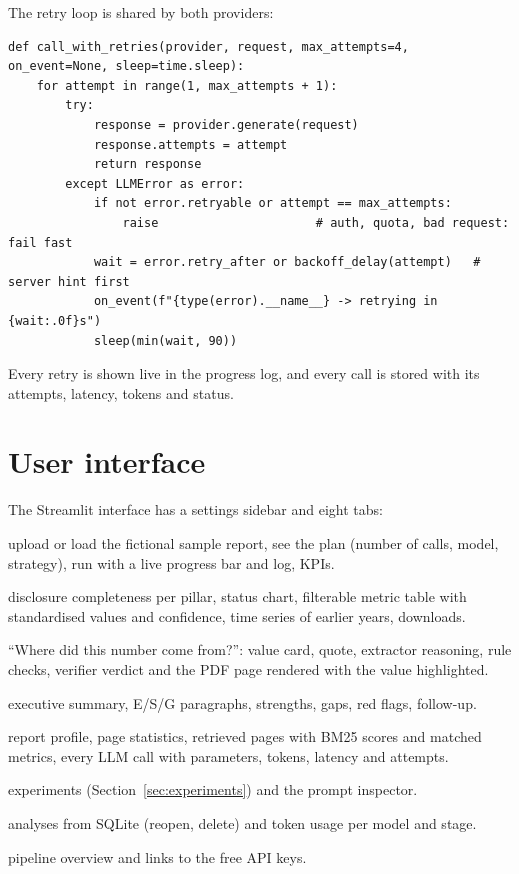 \documentclass[11pt,a4paper]{article}
\begin{document}
The retry loop is shared by both providers:
\begin{lstlisting}[style=py]
def call_with_retries(provider, request, max_attempts=4, on_event=None, sleep=time.sleep):
    for attempt in range(1, max_attempts + 1):
        try:
            response = provider.generate(request)
            response.attempts = attempt
            return response
        except LLMError as error:
            if not error.retryable or attempt == max_attempts:
                raise                      # auth, quota, bad request: fail fast
            wait = error.retry_after or backoff_delay(attempt)   # server hint first
            on_event(f"{type(error).__name__} -> retrying in {wait:.0f}s")
            sleep(min(wait, 90))
\end{lstlisting}
Every retry is shown live in the progress log, and every call is stored with its attempts, latency, tokens
and status.

\section{User interface}\label{sec:ui}
The Streamlit interface has a settings sidebar and eight tabs:
\begin{description}[style=nextline,leftmargin=1.2cm]
  \item[Analyze] upload or load the fictional sample report, see the plan (number of calls, model,
        strategy), run with a live progress bar and log, KPIs.
  \item[ESG Metrics] disclosure completeness per pillar, status chart, filterable metric table with
        standardised values and confidence, time series of earlier years, downloads.
  \item[Evidence] ``Where did this number come from?'': value card, quote, extractor reasoning, rule checks,
        verifier verdict and the PDF page rendered with the value highlighted.
  \item[Summary] executive summary, E/S/G paragraphs, strengths, gaps, red flags, follow-up.
  \item[Report \& Pipeline] report profile, page statistics, retrieved pages with BM25 scores and matched
        metrics, every LLM call with parameters, tokens, latency and attempts.
  \item[Prompt Lab] experiments (Section~\ref{sec:experiments}) and the prompt inspector.
  \item[History] analyses from SQLite (reopen, delete) and token usage per model and stage.
  \item[About] pipeline overview and links to the free API keys.
\end{description}
\end{document}

